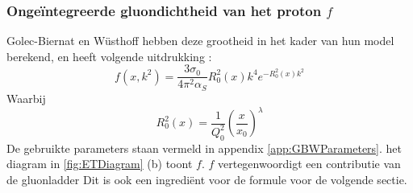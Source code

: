 \documentclass[a4paper,11pt]{article}
\numberwithin{equation}{section} %
\begin{document}
    \subsubsection{Ongeïntegreerde gluondichtheid van het proton $f$}
Golec-Biernat en Wüsthoff hebben deze grootheid in het kader van hun model berekend, en heeft volgende uitdrukking \cite[vgl. 9.255]{Barone}:
\begin{equation} \label{eq:UGD}
f(x,k^2) = \frac{3 \sigma_0}{4\pi^2 \alpha_S} R_0^2 (x) k^4 e^{-R_0^2(x) k^2}
\end{equation}
Waarbij
\begin{equation}
R_0^2(x) = \frac{1}{Q_0^2} \left( \frac{x}{x_0} \right)^\lambda
\end{equation}
De gebruikte parameters staan vermeld in appendix \ref{app:GBWParameters}.
het diagram in \ref{fig:ETDiagram} (b) toont $f$.
$f$ vertegenwoordigt een contributie van de gluonladder
Dit is ook een ingrediënt voor de formule voor de volgende sectie.
\end{document}
